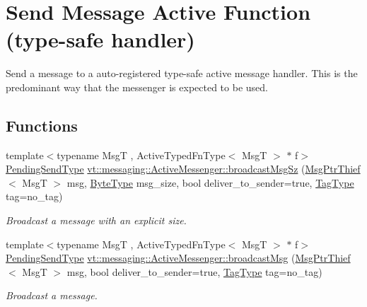 \hypertarget{group__typesafehan}{}\section{Send Message Active Function (type-\/safe handler)}
\label{group__typesafehan}


Send a message to a auto-\/registered type-\/safe active message handler. This is the predominant way that the messenger is expected to be used.  


\subsection*{Functions}
\begin{DoxyCompactItemize}
\item 
{\footnotesize template$<$typename MsgT , Active\+Typed\+Fn\+Type$<$ Msg\+T $>$ $\ast$ f$>$ }\\\hyperlink{structvt_1_1messaging_1_1_active_messenger_a3626a6ca76d8ad4ec7c3b47a2c70d3a8}{Pending\+Send\+Type} \hyperlink{group__typesafehan_ga469bf046ea32e6942ae2b00b7c14680d}{vt\+::messaging\+::\+Active\+Messenger\+::broadcast\+Msg\+Sz} (\hyperlink{structvt_1_1messaging_1_1_msg_ptr_thief}{Msg\+Ptr\+Thief}$<$ MsgT $>$ msg, \hyperlink{namespacevt_aab8d55968084610ce3b17057981e9300}{Byte\+Type} msg\+\_\+size, bool deliver\+\_\+to\+\_\+sender=true, \hyperlink{namespacevt_a84ab281dae04a52a4b243d6bf62d0e52}{Tag\+Type} tag=no\+\_\+tag)
\begin{DoxyCompactList}\small\item\em Broadcast a message with an explicit size. \end{DoxyCompactList}\item 
{\footnotesize template$<$typename MsgT , Active\+Typed\+Fn\+Type$<$ Msg\+T $>$ $\ast$ f$>$ }\\\hyperlink{structvt_1_1messaging_1_1_active_messenger_a3626a6ca76d8ad4ec7c3b47a2c70d3a8}{Pending\+Send\+Type} \hyperlink{group__typesafehan_ga1a347aac6b6b8d47c9b1c8cc11b7f33e}{vt\+::messaging\+::\+Active\+Messenger\+::broadcast\+Msg} (\hyperlink{structvt_1_1messaging_1_1_msg_ptr_thief}{Msg\+Ptr\+Thief}$<$ MsgT $>$ msg, bool deliver\+\_\+to\+\_\+sender=true, \hyperlink{namespacevt_a84ab281dae04a52a4b243d6bf62d0e52}{Tag\+Type} tag=no\+\_\+tag)
\begin{DoxyCompactList}\small\item\em Broadcast a message. \end{DoxyCompactList}\item 

\end{DoxyCompactItemize}

